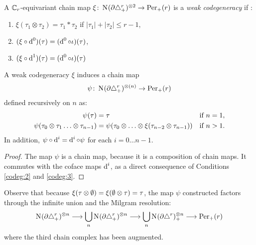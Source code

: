 \begin{definition}\label{def:weak_codegeneracy}
	A $\mathbb{C}_r$-equivariant chain map $\xi\colon \operatorname{N}_{}(\partial\triangle_{+}^r)^{\otimes 2}\to \mathrm{Per}_+(r)$ is a \emph{weak codegeneracy} if :
	\begin{enumerate}
		\item\label{codeg:1} $\xi(\tau_1\otimes \tau_2) = \tau_1*\tau_2$ if $|\tau_1| + |\tau_2| \leq r-1$,
		\item\label{codeg:2} $(\xi\circ \operatorname{d}^0)(\tau) = (\operatorname{d}^0\circ \iota)(\tau)$,
		\item\label{codeg:3} $(\xi\circ \operatorname{d}^1)(\tau) = (\operatorname{d}^0\circ \iota)(\tau)$
	\end{enumerate}
\end{definition}

\begin{proposition}\label{prop:milnor_to_per}
	A weak codegeneracy $\xi$ induces a chain map 
	\[
		\psi\colon \operatorname{N}_{}(\partial \triangle_{+}^{r})^{\otimes (n)}\to \mathrm{Per}_+(r)
	\]
	defined recursively on $n$ as:
	\begin{align*}
		\psi(\tau) &= \tau & \text{if $n=1$}, \\
		\psi(\tau_0\ot \tau_1 \ldots \ot \tau_{n-1}) &=  \psi(\tau_0\otimes \ldots\otimes \xi(\tau_{n-2}\otimes \tau_{n-1})) &\text{if $n>1$.} %
	\end{align*}
	In addition, $\psi\circ \operatorname{d}^i = \operatorname{d}^i\circ \psi$ for each $i=0\ldots n-1$.
\end{proposition} 
\begin{proof}
	The map $\psi$ is a chain map, because it is a composition of chain maps. It commutes with the coface maps $\operatorname{d}^i$, as a direct consequence of Conditions \eqref{codeg:2} and \eqref{codeg:3}. 
\end{proof}

 \begin{remark}
	Observe that because $\xi(\tau\otimes \emptyset) = \xi(\emptyset\otimes \tau) = \tau$, the map $\psi$ constructed factors through the infinite union and the Milgram resolution:
	\[
	\operatorname{N}_{}(\partial\triangle_{+}^{r})^{\otimes n}
	\longrightarrow
	\bigcup_n \operatorname{N}_{}(\partial \triangle_{+}^{r})^{\otimes n}
	\longrightarrow
	\bigcup_n \operatorname{N}_{}(\partial \triangle^{r})^{\otimes n}_+
	\longrightarrow
	\mathrm{Per}_+(r)
	\]
	where the third chain complex has been augmented.
\end{remark}


